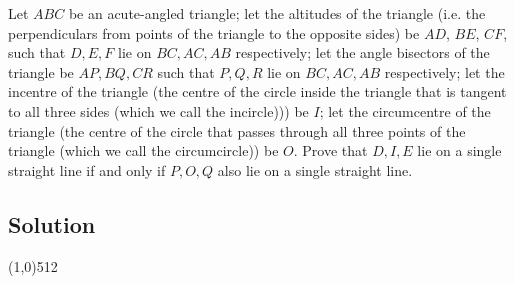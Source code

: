 \documentclass[11pt,a4paper]{report}
\let\origsection\subsection
\renewcommand{\subsection}[1]{\origsection{#1}\vspace{-0.5em}\line(1,0){512}\vspace{-1em}}
\begin{document}
	\begin{multicols}{2}
		
		Let \(ABC\) be an acute-angled triangle; let the altitudes of the triangle (i.e. the perpendiculars from points of the triangle to the opposite sides) be \(AD\), \(BE\), \(CF\), such that \(D, E, F\) lie on \(BC, AC, AB\) respectively; let the angle bisectors of the triangle be \(AP, BQ, CR\) such that \(P, Q, R\) lie on \(BC, AC, AB\) respectively; let the incentre of the triangle (the centre of the circle inside the triangle that is tangent to all three sides (which we call the incircle))) be \(I\); let the circumcentre of the triangle (the centre of the circle that passes through all three points of the triangle (which we call the circumcircle)) be \(O\). Prove that \(D, I, E\) lie on a single straight line if and only if \(P, O, Q\) also lie on a single straight line.
		
	\end{multicols}
	
	\subsection{Solution}
	
\end{document}
